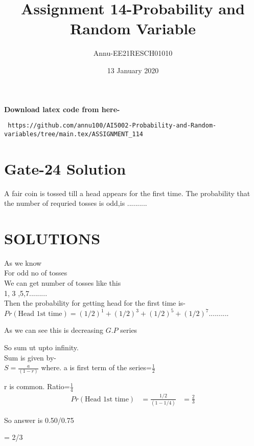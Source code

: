 \documentclass[journel,12pt,twocoloums]{IEEEtran}
\title{Assignment 14-Probability and Random Variable}
\author{Annu-EE21RESCH01010}
\date{13 January 2020}
\begin{document}
 \maketitle
\textbf{Download latex code from here-}\\
\begin{lstlisting}
 https://github.com/annu100/AI5002-Probability-and-Random-variables/tree/main.tex/ASSIGNMENT_114
 \end{lstlisting}

 \section{Gate-24 Solution}

A fair coin is tossed till a head appears for the
first time. The probability that the number of
requried tosses is odd,is ..........

\section{SOLUTIONS}
As we know\\
For odd no of tosses\\

We can get number of tosses like this\\

1, 3 ,5,7.........\\
Then the probability for getting head for the first time is-\\
$Pr(\text{Head 1st time})=(1/2)^1+ (1/2)^3 +(1/2)^5 +(1/2)^7 ..........$

As we can see this is decreasing $G.P$ series

So sum ut upto infinity.\\
Sum is given by-\\
$S=\frac{a}{(1-r)}$
where.
a is first term of the series=$\frac{1}{2}$

r is common. Ratio=$\frac{1}{4}$
\begin{align}
    Pr(\text{Head 1st time})&=\frac{1/2}{(1-1/4)}
                     &=\frac{2}{3}
\end{align}

So answer is 0.50/0.75

= 2/3
\end{document}
